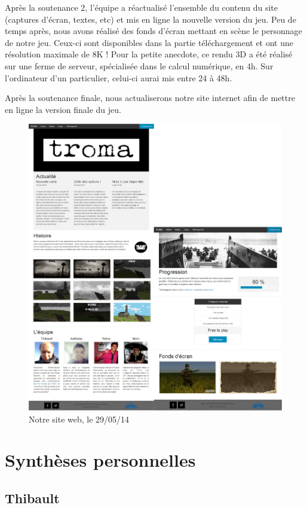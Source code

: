 \documentclass[11pt]{report}
\begin{document}
Après la soutenance 2, l'équipe a réactualisé l'ensemble du contenu du site (captures d'écran, textes, etc) et mis en ligne la nouvelle version du jeu. Peu de temps après, nous avons réalisé des fonds d'écran mettant en scène le personnage de notre jeu. Ceux-ci sont disponibles dans la partie téléchargement et ont une résolution maximale de 8K ! Pour la petite anecdote, ce rendu 3D a été réalisé sur une ferme de serveur, spécialisée dans le calcul numérique, en 4h. Sur l'ordinateur d'un particulier, celui-ci aurai mis entre 24 à 48h.

Après la soutenance finale, nous actualiserons notre site internet afin de mettre en ligne la version finale du jeu.

\begin{figure}[htbp]
\centering
\includegraphics[width=13cm]{site_web.png}
\caption{Notre site web, le 29/05/14}
\end{figure}

\chapter{Synthèses personnelles}

\section{Thibault}
\end{document}
